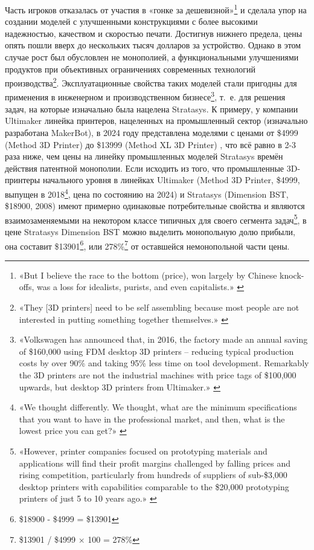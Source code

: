 \documentclass{article}
\begin{document}
Часть игроков отказалась от участия в «гонке за дешевизной»\footnote{«But I believe the race to the bottom (price), won largely by Chinese knock-offs, was a loss for idealists, purists, and even capitalists.» \cite{rrAnniversaryInterviewBrookDrumm2018}} и сделала упор на создании моделей с улучшенными конструкциями с более высокими надежностью, качеством и скоростью печати. Достигнув нижнего предела, цены опять пошли вверх до нескольких тысяч долларов за устройство. Однако в этом случае рост был обусловлен не монополией, а функциональными улучшениями продуктов при объективных ограничениях современных технологий производства\footnote{«They [3D printers] need to be self assembling because most people are not interested in putting something together themselves.» \cite{rrAnniversaryIntervieChrisPalmer2018}}. Эксплуатационные свойства таких моделей стали пригодны для применения в инженерном и производственном бизнесе\footnote{«Volkswagen has announced that, in 2016, the factory made an annual saving of \$160,000 using FDM desktop 3D printers – reducing typical production costs by over 90\% and taking 95\% less time on tool development. Remarkably the 3D printers are not the industrial machines with price tags of \$100,000 upwards, but desktop 3D printers from Ultimaker.» \cite{3dprintingindustryVolkswagenUltimaker2017}}, т.~е. для решения задач, на которые изначально была нацелена Stratasys. К примеру, у компании Ultimaker линейка принтеров, нацеленных на промышленный сектор (изначально разработана MakerBot), в 2024 году представлена моделями с ценами от \$4999 (Method 3D Printer) до \$13999 (Method XL 3D Printer) \cite{ultimakerMethod2024}, что всё равно в 2-3 раза ниже, чем цены на линейку промышленных моделей Stratasys времён действия патентной монополии. Если исходить из того, что промышленные 3D-принтеры начального уровня в линейках Ultimaker (Method 3D Printer, \$4999, выпущен в 2018\footnote{«We thought differently. We thought, what are the minimum specifications that you want to have in the professional market, and then, what is the lowest price you can get?» \cite{3dprintingindustryMakerBotMethod2018}}, цена по состоянию на 2024) и Stratasys (Dimension BST, \$18900, 2008) имеют примерно одинаковые потребительные свойства и являются взаимозаменяемыми на некотором классе типичных для своего сегмента задач\footnote{«However, printer companies focused on prototyping materials and applications will find their profit margins challenged by falling prices and rising competition, particularly from hundreds of suppliers of sub-\$3,000 desktop printers with capabilities comparable to the \$20,000 prototyping printers of just 5 to 10 years ago.» \cite{nstiLuxHow3dPrintingAddsUp2014}}, в цене Stratasys Dimension BST можно выделить монопольную долю прибыли, она составит \$13901\footnote{\$18900 - \$4999 = \$13901}, или 278\%\footnote{\$13901 / \$4999 × 100 = 278\%} от оставшейся немонопольной части цены.
\end{document}
